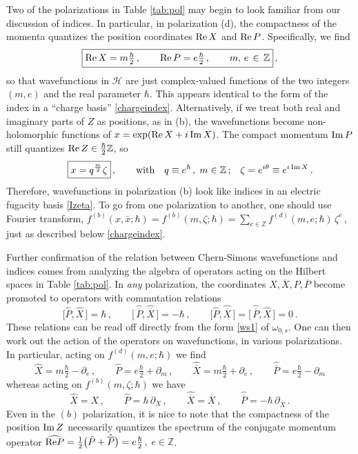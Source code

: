 \documentclass[11pt,letterpaper]{article}
\numberwithin{equation}{section}
\newcommand{\be}{\begin{equation}}
\newcommand{\ee}{\end{equation}}
\newcommand{\ol}{\overline}
\newcommand{\Z}{{\mathbb Z}}
\renewcommand{\Re}{{\rm Re}}
\renewcommand{\Im}{{\rm Im}}
\newcommand{\pd}{\partial}
\newcommand{\CH}{\mathcal{H}}
\begin{document}
Two of the polarizations in Table \ref{tab:pol} may begin to look familiar from our discussion of indices. In particular, in polarization (d), the compactness of the momenta quantizes the position coordinates $\Re\,X$ and $\Re\,P$. Specifically, we find
%
\be \boxed{\Re\,X = m\tfrac{\hbar}2\,,\qquad \Re\,P = e\tfrac{\hbar}{2}\,,\qquad m,\,e\,\in\,\Z}\,, \ee
%
so that wavefunctions in $\CH$ are just complex-valued functions of the two integers $(m,e)$ and the real parameter $\hbar$. This appears identical to the form of the index in a ``charge basis'' \eqref{chargeindex}. Alternatively, if we treat both real and imaginary parts of $Z$ as positions, as in (b), the wavefunctions become non-holomorphic functions of $x = \exp(\Re\,X+i\,\Im\,X)$. The compact momentum $\Im\, P$ still quantizes $\Re\,Z\in \tfrac\hbar2\Z$, so
%
\be \hspace{.3in} \boxed{x = q^{\frac m2}\zeta}\,,\qquad\text{with}\quad q\equiv e^\hbar\,,\; m\in \Z\,;\;\;\; \zeta =e^{i\theta} \equiv e^{i\,\Im\,X}\,.
\label{zzeta} \ee
%
Therefore, wavefunctions in polarization (b) look like indices in an electric fugacity basis \eqref{Izeta}. To go from one polarization to another, one should use Fourier transform,
%
$f^{(b)}(x,\bar x;\hbar)= f^{(b)}(m,\zeta;\hbar) = \sum_{e\in \Z} f^{(d)}(m,e;\hbar)\,\zeta^e\,,$
%
just as described below \eqref{chargeindex}.

Further confirmation of the relation between Chern-Simons wavefunctions and indices comes from analyzing the algebra of operators acting on the Hilbert spaces in Table \ref{tab:pol}. In \emph{any} polarization, the coordinates $X,\ol X,P,\ol P$ become promoted to operators with commutation relations
%
\be \big[\hat P,\hat X\,\big]=\hbar\,,\qquad \big[\,\hat{\ol P},\hat{\ol X}\,\big]=-\hbar\,,\qquad \big[\hat P,\hat{\ol X}\,\big]=\big[\,\hat{\ol P},\hat X\,\big]=0\,. \label{CSops} \ee
%
These relations can be read off directly from the form \eqref{ws1} of $\omega_{0,s}$. One can then work out the action of the operators on wavefunctions, in various polarizations. In particular, acting on $f^{(d)}(m,e;\hbar)$ we find
%
\be \hat X=m\tfrac\hbar 2-\pd_e\,,\qquad \hat P=e\tfrac\hbar2+\pd_m\,,\qquad \hat{\ol X}=m\tfrac\hbar 2+\pd_e\,,\qquad \hat {\ol P}=e\tfrac\hbar2-\pd_m \ee
%
whereas acting on $f^{(b)}(m,\zeta;\hbar)$ we have
%
\be \hat X=X\,,\qquad \hat P=\hbar \,\pd_X\,,\qquad \hat{\ol X}=\ol X\,,\qquad \hat {\ol P}=-\hbar\,\pd_{\ol X}\,. \ee
%
Even in the $(b)$ polarization, it is nice to note that the compactness of the position $\Im\,Z$ necessarily quantizes the spectrum of the conjugate momentum operator $\widehat{\Re P}=\tfrac12\big(\hat P+\hat {\ol P}\big) = e\tfrac\hbar2\,,$ $e\in \Z$.
\end{document}
